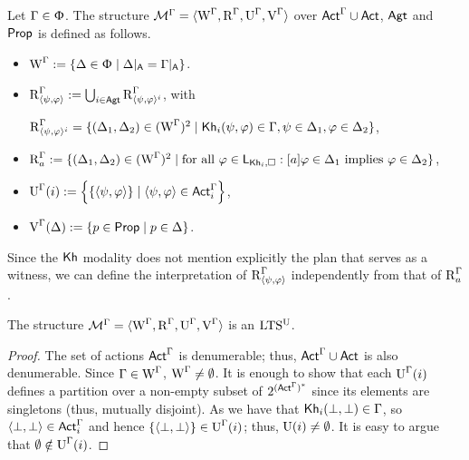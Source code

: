 \begin{definition}\label{def:cm-ults-khiml}
Let $\Gamma \in \Upphi$. The structure $\mathcal{M}^\Gamma=\langle \operatorname{W}^\Gamma, \operatorname{R}^\Gamma, \operatorname{U}^\Gamma, \operatorname{V}^\Gamma \rangle$ over ${\rm \sf Act}^\Gamma \cup {\rm \sf Act}$, ${\rm \sf Agt}$ and ${\rm \sf Prop}$ is defined as follows.
\begin{itemize}
\item $\operatorname{W}^\Gamma := \{ \Delta \in \Upphi \mid \Delta\vert_{{\sf A}} = \Gamma\vert_{{\sf A}} \}$.

\item $\operatorname{R}^{\Gamma}_{\langle \psi,\varphi \rangle} := \bigcup_{i \in {\rm \sf Agt}} \operatorname{R}^{\Gamma} _{\langle \psi,\varphi \rangle^i}$, with
\begin{center}
$\operatorname{R}^{\Gamma}_{\langle \psi,\varphi \rangle^i} = \{ (\Delta_1, \Delta_2) \in (\operatorname{W}^\Gamma)^2 \mid {\sf Kh}_i(\psi,\varphi) \in \Gamma, \psi \in \Delta_1, \varphi \in \Delta_2 \}$,
\end{center}

\item $\operatorname{R}^{\Gamma}_a := \{ (\Delta_1, \Delta_2) \in (\operatorname{W}^\Gamma)^2 \mid  \text{for all } \varphi \in \mathsf{L}_{{\sf Kh}_i,\square}: [a]\varphi \in \Delta_1 \text{ implies } \varphi \in \Delta_2  \}$,

\item $\operatorname{U}^\Gamma(i) := \left\{ \{ \langle \psi,\varphi \rangle \} \mid \langle \psi,\varphi \rangle \in {\rm \sf Act}^\Gamma_i \right\}$,

\item $\operatorname{V}^\Gamma(\Delta) := \{ p \in {\rm \sf Prop} \mid p \in \Delta \}$.
\end{itemize}
\end{definition}

\medskip
Since the ${\sf Kh}$ modality does not mention explicitly the plan that serves as a witness, we can define the interpretation of $\operatorname{R}^{\Gamma}_{\langle \psi,\varphi \rangle}$ independently from that of $\operatorname{R}^{\Gamma}_a$.
\medskip


\begin{proposition}\label{pro:cm-ults-khiml}
The structure $\mathcal{M}^\Gamma = \langle \operatorname{W}^\Gamma, \operatorname{R}^\Gamma, \operatorname{U}^\Gamma, \operatorname{V}^\Gamma \rangle$ is an $\textup{LTS$^\text{\textup{U}}$}$.
\end{proposition}
\begin{proof}
The set of actions ${\rm \sf Act}^\Gamma$ is denumerable; thus, ${\rm \sf Act}^\Gamma\cup{\rm \sf Act}$ is also denumerable.
Since $\Gamma \in \operatorname{W}^\Gamma$, $\operatorname{W}^\Gamma \neq \emptyset$.
It is enough to show that each $\operatorname{U}^\Gamma(i)$ defines a partition over a non-empty subset of $2^{({\rm \sf Act}^\Gamma)^*}$ since its elements are singletons (thus, mutually disjoint).
As we have that ${\sf Kh}_i(\bot,\bot) \in \Gamma$, so $\langle \bot, \bot \rangle \in {\rm \sf Act}^\Gamma_i$ and hence $\{ \langle \bot, \bot \rangle \} \in \operatorname{U}^\Gamma(i)$; thus, $\operatorname{U}(i) \neq \emptyset$.
It is easy to argue that $\emptyset \notin \operatorname{U}^\Gamma(i)$.
\end{proof}


